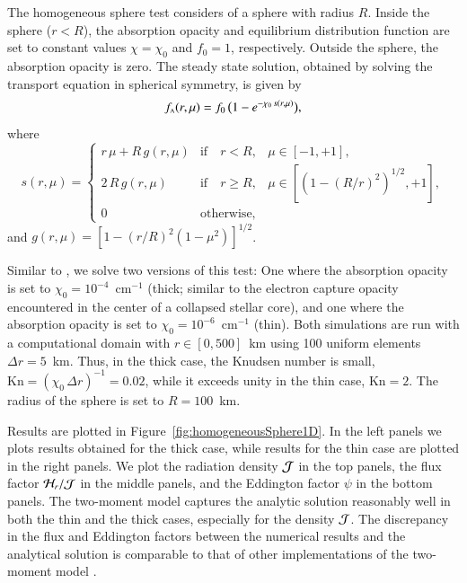 \documentclass[11pt,letterpaper,twoside,english,final]{article}
\begin{document}
The homogeneous sphere test \citep[cf.][]{smit_etal_1997} considers of a sphere with radius $R$.  
Inside the sphere ($r<R$), the absorption opacity and equilibrium distribution function are set to constant values $\chi=\chi_{0}$ and $f_{0}=1$, respectively.  
Outside the sphere, the absorption opacity is zero.  
The steady state solution, obtained by solving the transport equation in spherical symmetry, is given by
\begin{equation}
  f_{\mbox{\tiny A}}(r,\mu)=f_{0}\,\big(1-e^{-\chi_{0}\,s(r,\mu)}\big),
  \label{distributionHomogeneousSphere}
\end{equation}
where
\begin{equation}
  s(r,\mu)
  =\left\{
  \begin{array}{lll}
    r\,\mu+R\,g(r,\mu) & \mbox{if}\quad r<R, & \mu\in[-1,+1], \\
    2\,R\,g(r,\mu) & \mbox{if}\quad r \ge R, & \mu\in[(1-(R/r)^{2})^{1/2},+1], \\
    0 & \mbox{otherwise},
  \end{array}
  \right.
\end{equation}
and $g(r,\mu)=[1-(r/R)^{2}(1-\mu^{2})]^{1/2}$.  

Similar to \citet{oConnor_2015}, we solve two versions of this test: One where the absorption opacity is set to $\chi_{0}=10^{-4}$~cm$^{-1}$ (thick; similar to the electron capture opacity encountered in the center of a collapsed stellar core), and one where the absorption opacity is set to $\chi_{0}=10^{-6}$~cm$^{-1}$ (thin).  
Both simulations are run with a computational domain with $r\in[0,500]$~km using 100 uniform elements $\Delta r=5$~km.  
Thus, in the thick case, the Knudsen number is small, $\mbox{Kn}=(\chi_{0}\,\Delta r)^{-1}=0.02$, while it exceeds unity in the thin case, $\mbox{Kn}=2$.  
The radius of the sphere is set to $R=100$~km.  

Results are plotted in Figure~\ref{fig:homogeneousSphere1D}.  
In the left panels we plots results obtained for the thick case, while results for the thin case are plotted in the right panels.  
We plot the radiation density $\mathcal{J}$ in the top panels, the flux factor $\mathcal{H}_{r}/\mathcal{J}$ in the middle panels, and the Eddington factor $\psi$ in the bottom panels.  
The two-moment model captures the analytic solution reasonably well in both the thin and the thick cases, especially for the density $\mathcal{J}$.  
The discrepancy in the flux and Eddington factors between the numerical results and the analytical solution is comparable to that of other implementations of the two-moment model \citep[e.g.,][]{smit_etal_1997}.  
\end{document}
